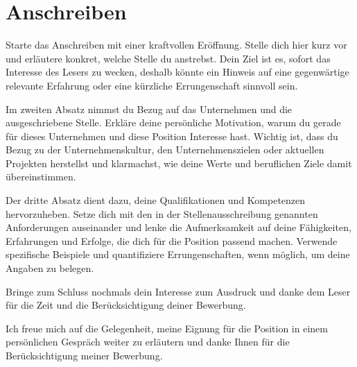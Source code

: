 \documentclass{moderncv}
\begin{document}
    \section{Anschreiben}\label{sec:anschreiben}
    \makelettertitle

    Starte das Anschreiben mit einer kraftvollen Eröffnung.
    Stelle dich hier kurz vor und erläutere konkret, welche Stelle du anstrebst.
    Dein Ziel ist es, sofort das Interesse des Lesers zu wecken, deshalb könnte ein Hinweis auf eine gegenwärtige relevante Erfahrung oder eine kürzliche Errungenschaft sinnvoll sein.

    Im zweiten Absatz nimmst du Bezug auf das Unternehmen und die ausgeschriebene Stelle.
    Erkläre deine persönliche Motivation, warum du gerade für dieses Unternehmen und diese Position Interesse hast.
    Wichtig ist, dass du Bezug zu der Unternehmenskultur, den Unternehmenszielen oder aktuellen Projekten herstellst und klarmachst, wie deine Werte und beruflichen Ziele damit übereinstimmen.

    Der dritte Absatz dient dazu, deine Qualifikationen und Kompetenzen hervorzuheben.
    Setze dich mit den in der Stellenausschreibung genannten Anforderungen auseinander und lenke die Aufmerksamkeit auf deine Fähigkeiten, Erfahrungen und Erfolge, die dich für die Position passend machen.
    Verwende spezifische Beispiele und quantifiziere Errungenschaften, wenn möglich, um deine Angaben zu belegen.

    Bringe zum Schluss nochmals dein Interesse zum Ausdruck und danke dem Leser für die Zeit und die Berücksichtigung deiner Bewerbung.

    Ich freue mich auf die Gelegenheit, meine Eignung für die Position in einem persönlichen Gespräch weiter zu erläutern und danke Ihnen für die Berücksichtigung meiner Bewerbung.

    \makeletterclosing
\end{document}

